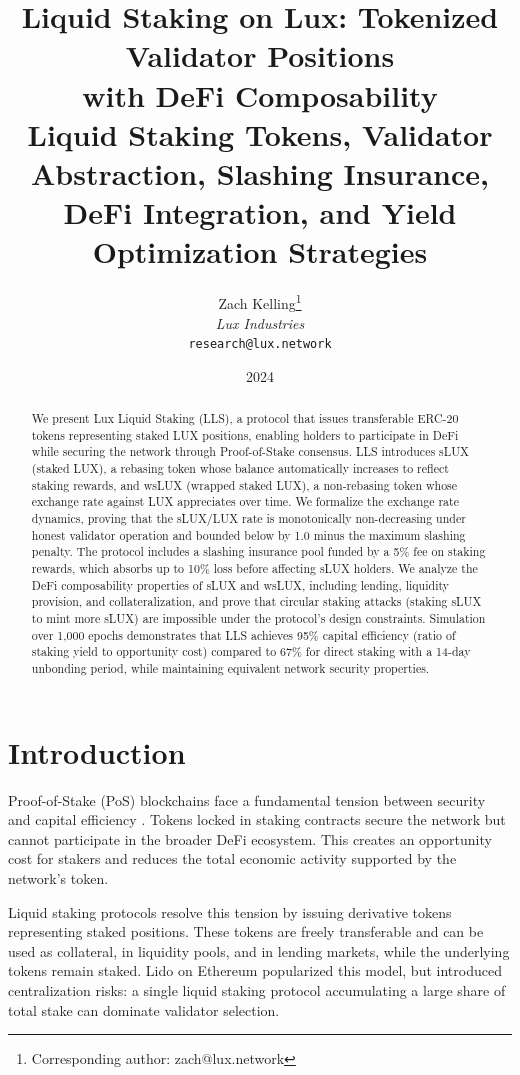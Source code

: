 \documentclass[11pt,a4paper]{article}
\title{\textbf{Liquid Staking on Lux: Tokenized Validator Positions\\with DeFi Composability}\\[6pt]
\large Liquid Staking Tokens, Validator Abstraction, Slashing Insurance,\\DeFi Integration, and Yield Optimization Strategies}
\author{
Zach Kelling\thanks{Corresponding author: zach@lux.network}\\
\textit{Lux Industries}\\
\texttt{research@lux.network}
}
\date{2024}
\begin{document}
\luxcoverpage
\maketitle

\begin{abstract}
We present Lux Liquid Staking (LLS), a protocol that issues transferable ERC-20 tokens representing staked LUX positions, enabling holders to participate in DeFi while securing the network through Proof-of-Stake consensus. LLS introduces sLUX (staked LUX), a rebasing token whose balance automatically increases to reflect staking rewards, and wsLUX (wrapped staked LUX), a non-rebasing token whose exchange rate against LUX appreciates over time. We formalize the exchange rate dynamics, proving that the sLUX/LUX rate is monotonically non-decreasing under honest validator operation and bounded below by 1.0 minus the maximum slashing penalty. The protocol includes a slashing insurance pool funded by a 5\% fee on staking rewards, which absorbs up to 10\% loss before affecting sLUX holders. We analyze the DeFi composability properties of sLUX and wsLUX, including lending, liquidity provision, and collateralization, and prove that circular staking attacks (staking sLUX to mint more sLUX) are impossible under the protocol's design constraints. Simulation over 1,000 epochs demonstrates that LLS achieves 95\% capital efficiency (ratio of staking yield to opportunity cost) compared to 67\% for direct staking with a 14-day unbonding period, while maintaining equivalent network security properties.
\end{abstract}

\section{Introduction}

Proof-of-Stake (PoS) blockchains face a fundamental tension between security and capital efficiency \cite{saleh2021blockchain}. Tokens locked in staking contracts secure the network but cannot participate in the broader DeFi ecosystem. This creates an opportunity cost for stakers and reduces the total economic activity supported by the network's token.

Liquid staking protocols resolve this tension by issuing derivative tokens representing staked positions. These tokens are freely transferable and can be used as collateral, in liquidity pools, and in lending markets, while the underlying tokens remain staked. Lido on Ethereum \cite{lidofinance} popularized this model, but introduced centralization risks: a single liquid staking protocol accumulating a large share of total stake can dominate validator selection.
\end{document}
